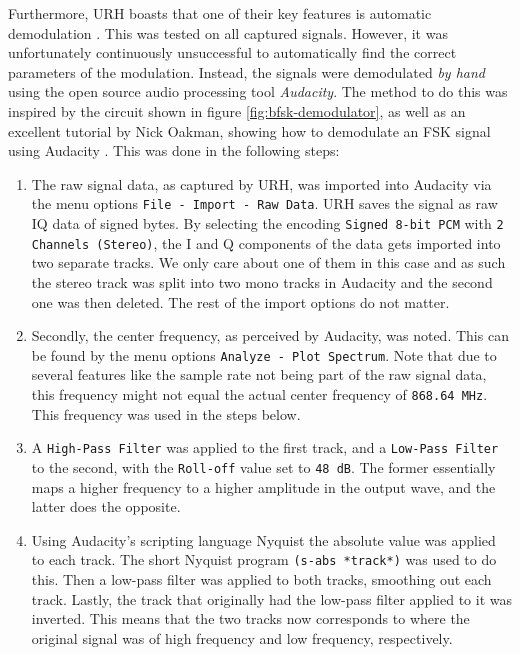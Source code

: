 Furthermore, \gls{URH} boasts that one of their key features is automatic demodulation \cite{urh}. This was tested on all captured signals. However, it was unfortunately continuously unsuccessful to automatically find the correct parameters of the modulation. Instead, the signals were demodulated \textit{by hand} using the open source audio processing tool \textit{Audacity}. The method to do this was inspired by the circuit shown in figure \ref{fig:bfsk-demodulator}, as well as an excellent tutorial by Nick Oakman, showing how to demodulate an FSK signal using Audacity \cite{oakman-fsk}. This was done in the following steps:
\begin{enumerate}
    \item The raw signal data, as captured by URH, was imported into Audacity via the menu options \texttt{File - Import - Raw Data}. URH saves the signal as raw IQ data of signed bytes. By selecting the encoding \texttt{Signed 8-bit PCM} with \texttt{2 Channels (Stereo)}, the I and Q components of the data gets imported into two separate tracks. We only care about one of them in this case and as such the stereo track was split into two mono tracks in Audacity and the second one was then deleted. The rest of the import options do not matter.

    \item Secondly, the center frequency, as perceived by Audacity, was noted. This can be found by the menu options \texttt{Analyze - Plot Spectrum}. Note that due to several features like the sample rate not being part of the raw signal data, this frequency might not equal the actual center frequency of \texttt{868.64 MHz}. This frequency was used in the steps below.

    \item A \texttt{High-Pass Filter} was applied to the first track, and a \texttt{Low-Pass Filter} to the second, with the \texttt{Roll-off} value set to \texttt{48 dB}. The former essentially maps a higher frequency to a higher amplitude in the output wave, and the latter does the opposite.

    \item Using Audacity's scripting language Nyquist the absolute value was applied to each track. The short Nyquist program \texttt{(s-abs *track*)} was used to do this. Then a low-pass filter was applied to both tracks, smoothing out each track. Lastly, the track that originally had the low-pass filter applied to it was inverted. This means that the two tracks now corresponds to where the original signal was of high frequency and low frequency, respectively.


\end{enumerate}
